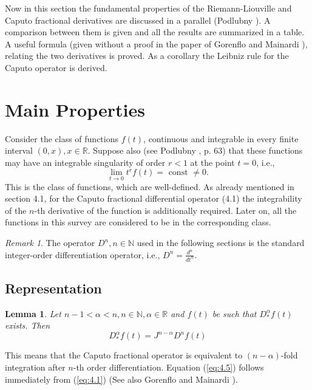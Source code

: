 \documentclass[a4paper,14pt,oneside]{book}
\theoremstyle{plain}
\newtheorem{lem}[thm]{Lemma}
\theoremstyle{definition}
\theoremstyle{remark}
\newtheorem{rmk}{Remark}[section]
\begin{document}
        \begin{center}
\begin{flushleft} 
\justify
\Large{
Now in this section the fundamental properties of the Riemann-Liouville and Caputo fractional derivatives are discussed in a parallel (Podlubny \cite{bb22}). A comparison between them is given and all the results are summarized in a table. A useful formula (given without a proof in the paper of Gorenflo and Mainardi \cite{bb18}), relating the two derivatives is proved. As a corollary the Leibniz rule for the Caputo operator is derived.

\section{Main Properties}
Consider the class of functions $f(t)$, continuous and integrable in every finite interval $(0, x), x \in \mathbb{R}$. Suppose also (see Podlubny \cite{bb22}, p. 63) that these functions may have an integrable singularity of order $r<1$ at the point $t=0$, i.e.,
$$
\lim_{t \rightarrow 0} t^{r} f(t)=\text { const } \neq 0 .
$$
This is the class of functions, which are well-defined. As already mentioned in section 4.1, for the Caputo fractional differential operator (4.1) the integrability of the $n$-th derivative of the function is additionally required. Later on, all the functions in this survey are considered to be in the corresponding class.
\begin{rmk}
The operator $D^{n}, n \in \mathbb{N}$ used in the following sections is the standard integer-order differentiation operator, i.e., $D^{n}=\frac{d^{n}}{d t^{n}}$.
\end{rmk}

\subsection{Representation}
\begin{lem}
Let $n-1<\alpha<n, n \in \mathbb{N}, \alpha \in \mathbb{R}$ and $f(t)$ be such that $D_{*}^{\alpha} f(t)$ exists. Then
\begin{equation}\label{eq:4.5}
D_{*}^{\alpha} f(t)=J^{n-\alpha} D^{n} f(t)
\end{equation}
\end{lem}
This means that the Caputo fractional operator is equivalent to $(n-\alpha)$-fold integration after $n$-th order differentiation. Equation (\ref{eq:4.5}) follows immediately from (\ref{eq:4.1}) (See also Gorenflo and Mainardi \cite{bb18}).

}
\end{flushleft}
\end{center}
\end{document}
